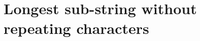 \documentclass[a4paper,11pt]{book}
\begin{document}
%
%
%
% 
%
% 
% 
% 
%
% 
% 
% 
% 

\newpage
\section{Longest sub-string without repeating characters}
\end{document}
